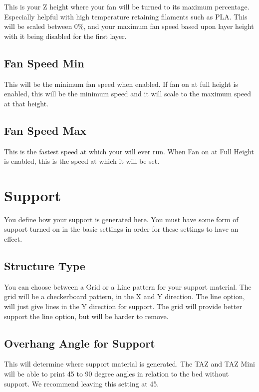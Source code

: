 This is your Z height where your fan will be turned to its maximum percentage. Especially helpful with high temperature retaining filaments such as PLA. This will be scaled between 0\%, and your maximum fan speed based upon layer height with it being disabled for the first layer.

\subsection{Fan Speed Min}

This will be the minimum fan speed when enabled. If fan on at full height is enabled, this will be the minimum speed and it will scale to the maximum speed at that height.

\subsection{Fan Speed Max}

This is the fastest speed at which your will ever run. When Fan on at Full Height is enabled, this is the speed at which it will be set.

\section{Support}

You define how your support is generated here. You must have some form of support turned on in the basic settings in order for these settings to have an effect.

\subsection{Structure Type}

You can choose between a Grid or a Line pattern for your support material. The grid will be a checkerboard pattern, in the X and Y direction. The line option, will just give lines in the Y direction for support. The grid will provide better support the line option, but will be harder to remove.

\subsection{Overhang Angle for Support}

This will determine where support material is generated. The TAZ and TAZ Mini will be able to print 45 to 90 degree angles in relation to the bed without support. We recommend leaving this setting at 45.


